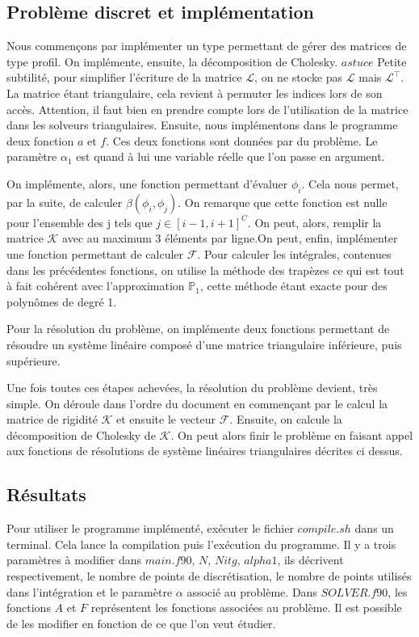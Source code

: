 \documentclass[a4paper,french,10pt]{article}
\begin{document}
\subsection{Problème discret et implémentation}
Nous commençons par implémenter un type permettant de gérer des matrices de type profil. On implémente, ensuite, la décomposition de Cholesky. 
\newline $astuce$
\newline Petite subtilité, pour simplifier l'écriture de la matrice $\mathcal{L}$, on ne stocke pas $\mathcal{L}$ mais $\mathcal{L}^\intercal$. La matrice étant triangulaire, cela revient à permuter les indices lors de son accès. Attention, il faut bien en prendre compte lors de l'utilisation de la matrice dans les solveurs triangulaires.
\newline\newline Ensuite, nous implémentons dans le programme deux fonction $a$ et $f$. Ces deux fonctions sont données par du problème. Le paramètre $\alpha_1$ est quand à lui une variable réelle que l'on passe en argument.

On implémente, alors, une fonction permettant d'évaluer $\phi_i$. Cela nous permet, par la suite, de calculer $\beta(\phi_i,\phi_j)$. On remarque que cette fonction est nulle pour l'ensemble des j tels que $j \in [i-1,i+1]^C$. On peut, alors, remplir la matrice $\mathcal{K}$ avec au maximum 3 éléments par ligne.On peut, enfin, implémenter une fonction permettant de calculer $\mathcal{F}$.
Pour calculer les intégrales, contenues dans les précédentes fonctions, on utilise la méthode des trapèzes ce qui est tout à fait cohérent avec l'approximation $\mathds{P}_1$, cette méthode étant exacte pour des polynômes de degré 1.

Pour la résolution du problème, on implémente deux fonctions permettant de résoudre un système linéaire composé d'une matrice triangulaire inférieure, puis supérieure.

Une fois toutes ces étapes achevées, la résolution du problème devient, très simple. On déroule dans l'ordre du document en commençant par le calcul la matrice de rigidité $\mathcal{K}$ et ensuite le vecteur $\mathcal{F}$. Ensuite, on calcule la décomposition de Cholesky de $\mathcal{K}$. On peut alors finir le problème en faisant appel aux fonctions de résolutions de système linéaires triangulaires décrites ci dessus.
\newpage
\subsection{Résultats}
	Pour utiliser le programme implémenté, exécuter le fichier $compile.sh$ dans un terminal. Cela lance la compilation puis l’exécution du programme. Il y a trois paramètres à modifier dans $main.f90$, $N$, $Nitg$, $alpha1$, ils décrivent respectivement, le nombre de points de discrétisation, le nombre de points utilisés dans l'intégration et le paramètre $\alpha$ associé au problème. Dans $SOLVER.f90$, les fonctions $A$ et $F$ représentent les fonctions associées au problème. Il est possible de les modifier en fonction de ce que l'on veut étudier.
    
\end{document}

